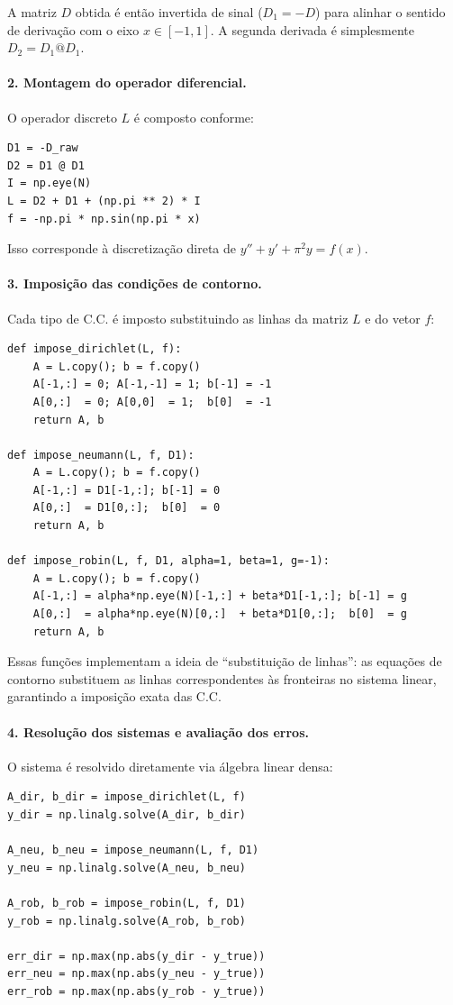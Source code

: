 \documentclass[12pt,a4paper]{article}
\begin{document}
A matriz \(D\) obtida é então invertida de sinal (\(D_1 = -D\)) para alinhar o sentido de derivação com o eixo \(x \in [-1,1]\).  
A segunda derivada é simplesmente \(D_2 = D_1 @ D_1\).

\paragraph{2. Montagem do operador diferencial.}
O operador discreto \(L\) é composto conforme:
\begin{verbatim}
D1 = -D_raw
D2 = D1 @ D1
I = np.eye(N)
L = D2 + D1 + (np.pi ** 2) * I
f = -np.pi * np.sin(np.pi * x)
\end{verbatim}
Isso corresponde à discretização direta de \(y'' + y' + \pi^2 y = f(x)\).

\paragraph{3. Imposição das condições de contorno.}
Cada tipo de C.C. é imposto substituindo as linhas da matriz \(L\) e do vetor \(f\):

\begin{verbatim}
def impose_dirichlet(L, f):
    A = L.copy(); b = f.copy()
    A[-1,:] = 0; A[-1,-1] = 1; b[-1] = -1
    A[0,:]  = 0; A[0,0]  = 1;  b[0]  = -1
    return A, b

def impose_neumann(L, f, D1):
    A = L.copy(); b = f.copy()
    A[-1,:] = D1[-1,:]; b[-1] = 0
    A[0,:]  = D1[0,:];  b[0]  = 0
    return A, b

def impose_robin(L, f, D1, alpha=1, beta=1, g=-1):
    A = L.copy(); b = f.copy()
    A[-1,:] = alpha*np.eye(N)[-1,:] + beta*D1[-1,:]; b[-1] = g
    A[0,:]  = alpha*np.eye(N)[0,:]  + beta*D1[0,:];  b[0]  = g
    return A, b
\end{verbatim}

Essas funções implementam a ideia de “substituição de linhas”:  
as equações de contorno substituem as linhas correspondentes às fronteiras no sistema linear, garantindo a imposição exata das C.C.

\paragraph{4. Resolução dos sistemas e avaliação dos erros.}
O sistema é resolvido diretamente via álgebra linear densa:
\begin{verbatim}
A_dir, b_dir = impose_dirichlet(L, f)
y_dir = np.linalg.solve(A_dir, b_dir)

A_neu, b_neu = impose_neumann(L, f, D1)
y_neu = np.linalg.solve(A_neu, b_neu)

A_rob, b_rob = impose_robin(L, f, D1)
y_rob = np.linalg.solve(A_rob, b_rob)

err_dir = np.max(np.abs(y_dir - y_true))
err_neu = np.max(np.abs(y_neu - y_true))
err_rob = np.max(np.abs(y_rob - y_true))
\end{verbatim}
\end{document}
